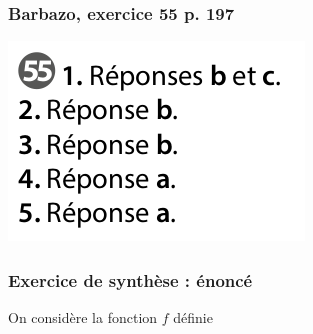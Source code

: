\documentclass[11pt, hyperref={urlcolor=red,%
            linkcolor=blue, %
            colorlinks=true}]{beamer}
\begin{document}
\begin{frame}
\frametitle{Barbazo, exercice 55 p. 197}
\label{exo55}
\begin{center}
	\includegraphics[scale=0.3]{exo55.png}
\end{center}


\end{frame}


\begin{frame}
\frametitle{Exercice de synthèse : énoncé}
\label{exosynthese}

On considère la fonction $f$ définie 

\end{frame}
\end{document}
